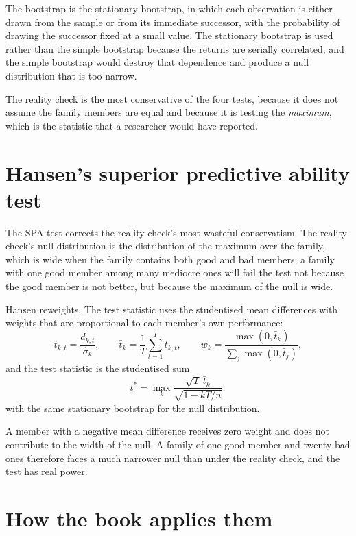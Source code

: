 The bootstrap is the stationary bootstrap, in which each observation is
either drawn from the sample or from its immediate successor, with the
probability of drawing the successor fixed at a small value. The
stationary bootstrap is used rather than the simple bootstrap because the
returns are serially correlated, and the simple bootstrap would destroy
that dependence and produce a null distribution that is too narrow.

The reality check is the most conservative of the four tests, because it
does not assume the family members are equal and because it is testing the
\emph{maximum}, which is the statistic that a researcher would have
reported.

\section{Hansen's superior predictive ability test}

The SPA test corrects the reality check's most wasteful conservatism. The
reality check's null distribution is the distribution of the maximum over
the family, which is wide when the family contains both good and bad
members; a family with one good member among many mediocre ones will fail
the test not because the good member is not better, but because the
maximum of the null is wide.

Hansen reweights. The test statistic uses the studentised mean differences
with weights that are proportional to each member's own performance:
\begin{equation}
t_{k,t} = \frac{d_{k,t}}{\hat{\sigma}_k},
\qquad
\bar{t}_k = \frac{1}{T}\sum_{t=1}^{T} t_{k,t},
\qquad
w_k = \frac{\max(0, \bar{t}_k)}{\sum_{j}\max(0, \bar{t}_j)},
\end{equation}
and the test statistic is the studentised sum
\begin{equation}
t^* = \max_k \frac{\sqrt{T}\,\bar{t}_k}
                           {\sqrt{1 - kT/n}},
\end{equation}
with the same stationary bootstrap for the null distribution.

A member with a negative mean difference receives zero weight and does
not contribute to the width of the null. A family of one good member and
twenty bad ones therefore faces a much narrower null than under the
reality check, and the test has real power.

\section{How the book applies them}

